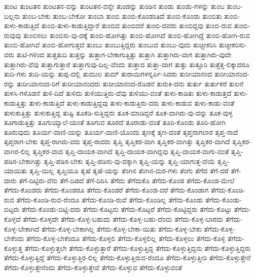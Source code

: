 {ತುಂಟ
ತುಂಟತನ
ತುಂಟತನ-ವನ್ನು
ತುಂಟತನ-ವನ್ನೇ
ತುಂಡನ್ನು
ತುಂಡಿನ
ತುಂಡು
ತುಂಡು-ಗಳನ್ನು
ತುಂಬ
ತುಂಬ-ಬಲ್ಲನು
ತುಂಬ-ಬೇಕು
ತುಂಬ-ಬೇಕೋ
ತುಂಬಾ
ತುಂಬಿ
ತುಂಬಿ-ಕೊಂಡಂತಿದೆ
ತುಂಬಿ-ಕೊಂಡು
ತುಂಬಿತು
ತುಂಬಿ-ತುಳು-ಕಾಡುತ್ತಿದೆ
ತುಂಬಿ-ತುಳು-ಕಾಡುತ್ತಿದ್ದಾರೆ
ತುಂಬಿದ
ತುಂಬಿದರೆ
ತುಂಬಿ-ದವರು
ತುಂಬಿದ್ದವು
ತುಂಬಿ-ರುವ
ತುಂಬಿ-ರುವುವು
ತುಂಬಿಸಲು
ತುಂಬಿಸು-ವು-ದಕ್ಕೆ
ತುಂಬಿ-ಹೋಗಿತ್ತು
ತುಂಬಿ-ಹೋಗಿದೆ
ತುಂಬಿ-ಹೋಗಿದ್ದೆ
ತುಂಬಿ-ಹೋಗಿ-ರುವ
ತುಂಬಿ-ಹೋಗಿವೆ
ತುಂಬಿ-ಹೋಗುತ್ತದೆ
ತುಂಬು
ತುಂಬುತ್ತಿದ್ದರು
ತುಂಬುವ
ತುಂಬು-ವುದು
ತುಚ್ಛೀಕರಿಸಿ
ತುಚ್ಛೀಕರಿಸು-ವರು
ತುಟಿ-ಗಳಿಂದ
ತುತ್ತತುದಿ
ತುತ್ತನ್ನು
ತುತ್ತಾಗ-ಬೇಕಾಗುತ್ತಿತ್ತು
ತುತ್ತಾಗಿ
ತುತ್ತಾಗಿರು-ವಾಗ
ತುತ್ತಾಗಿರು-ವುದೇ
ತುತ್ತಾಗಿರು-ವೆವು
ತುತ್ತಾಗುತ್ತಾರೆ
ತುತ್ತಾಗುವು-ದಿಲ್ಲ-ವೆಂದು
ತುತ್ತಾದ
ತುತ್ತಾ-ದಾಗ
ತುತ್ತು
ತುತ್ತೂರಿ
ತುತ್ತೆತ್ತ-ಲಿಕ್ಕಾದರೂ
ತುದಿ-ಗಳು
ತುದಿ-ಯನ್ನು
ತುಪ್ಪ-ದಲ್ಲಿ
ತುಮುಲ
ತುಮ್
ತುರಾಯಿಗಳನ್ನರ್ಪಿ-ಸಿದರು
ತುರೀಯಾನಂದ
ತುರೀಯಾನಂದ-ರನ್ನು
ತುರೀಯಾನಂದ-ರಿಗೆ
ತುರೀಯಾನಂದರು
ತುರೀಯಾನಂದ-ರೊಡನೆ
ತುರುಕಿ-ದನು
ತುರ್ತು
ತುರ್ತುಕರೆ
ತುಲನೆ
ತುಳಸಿ-ಗಳೊಡನೆ
ತುಳಿ-ದಿದೆ
ತುಳಿದು
ತುಳಿಯುತ್ತಿರು-ವೆವು
ತುಳಿಯು-ವಂತೆ
ತುಳು-ಕಾಡಿತು
ತುಳು-ಕಾಡುತ್ತದೆ
ತುಳು-ಕಾಡುತ್ತಿತ್ತು
ತುಳು-ಕಾಡುತ್ತಿದೆ
ತುಳು-ಕಾಡುತ್ತಿದ್ದವು
ತುಳು-ಕಾಡುತ್ತಿರು-ವರು
ತುಳು-ಕಾಡುವ
ತುಳು-ಕಾಡು-ವಂತೆ
ತುಳುಕುತ್ತಿತ್ತು
ತುಳುಕುತ್ತಿದ್ದ
ತುಷ್ಟಿ
ತೂಕಡಿ-ಸುತ್ತಿದ್ದರು
ತೂಕ-ಮಾಡಿದ್ದರೆ
ತೂಕ-ವಾಗಿರು-ವು-ದನ್ನು
ತೂಕ-ವುಳ್ಳ
ತೂಗಾಡುತ್ತಿತ್ತು
ತೂಗುಯ್ಯಾಲೆ-ಯಂತೆ
ತೂಗುವ
ತೂರದೆ
ತೂರಾಡು-ವಂತೆ
ತೂರಿ-ಕೊಂಡು
ತೂರಿ-ಹೋಗಿ
ತೂರುವುದು
ತೂರ್ಯ-ವಾಣಿ-ಯನ್ನು
ತೂರ್ಯ-ವಾಣಿ-ಯೊಂದು
ತೃಣಕ್ಕೆ
ತೃಣ-ದಂತೆ
ತೃಪ್ತನಾಗಲಾರ
ತೃಪ್ತ-ನಾದೆ
ತೃಪ್ತರಾಗ-ಬೇಕು
ತೃಪ್ತ-ರಾಗಿರು-ವರು
ತೃಪ್ತ-ರಾದರು
ತೃಪ್ತಿ
ತೃಪ್ತಿಕರ-ವಾಗಿ
ತೃಪ್ತಿಕರ-ವಾಗಿತ್ತು
ತೃಪ್ತಿಕರ-ವಾಗಿದೆ
ತೃಪ್ತಿಕರ-ವಾಗಿರ-ಲಿಲ್ಲ
ತೃಪ್ತಿಕರ-ವಾದ
ತೃಪ್ತಿ-ದಾಯಕ-ವಾಗಿದೆ
ತೃಪ್ತಿ-ದಾಯಕ-ವಾಗಿದ್ದವು
ತೃಪ್ತಿ-ದಾಯಕ-ವಾಗು-ವಂತೆ
ತೃಪ್ತಿ-ಪಡಿಸ-ಬೇಕಾಗಿತ್ತು
ತೃಪ್ತಿ-ಪಡಿಸ-ಬೇಕು
ತೃಪ್ತಿ-ಪಡಿಸು-ವು-ದಕ್ಕಾಗಿ
ತೃಪ್ತಿ-ಯನ್ನು
ತೃಪ್ತಿ-ಯಾಗುತ್ತ-ದೆಯೆ
ತೃಪ್ತಿ-ಯಾಯಿತು
ತೃಪ್ತಿ-ಯಿಲ್ಲ
ತೃಪ್ತಿಯೂ
ತೃಷೆ
ತೃಷೆ-ಯನ್ನು
ತೆಂಗಿನ
ತೆಂಗಿನ-ಮರ-ಗಳು
ತೆಂಗು
ತೆಗೆದ
ತೆಗೆ-ದರೆ
ತೆಗೆ-ದಾರು
ತೆಗೆ-ದಿಟ್ಟಿರು-ವೆನು
ತೆಗೆ-ದಿಡದೆ
ತೆಗೆ-ದಿರಿಸಿ
ತೆಗೆದು
ತೆಗೆದುಕೊ
ತೆಗೆದು-ಕೊಂಡ
ತೆಗೆದು-ಕೊಂಡ-ಮೇಲೆ
ತೆಗೆದು-ಕೊಂಡರು
ತೆಗೆದು-ಕೊಂಡರೂ
ತೆಗೆದು-ಕೊಂಡರೆ
ತೆಗೆದು-ಕೊಂಡ-ವರೆ
ತೆಗೆದು-ಕೊಂಡಾಗ
ತೆಗೆದು-ಕೊಂಡಿ-ರುವ
ತೆಗೆದು-ಕೊಂಡಿ-ರುವ-ರೆಂದೂ
ತೆಗೆದು-ಕೊಂಡಿ-ರುವೆ
ತೆಗೆದು-ಕೊಂಡಿಲ್ಲ
ತೆಗೆದು-ಕೊಂಡು
ತೆಗೆದು-ಕೊಂಡು-ಬಿಟ್ಟರು
ತೆಗೆದು-ಕೊಂಡು-ಬಿಟ್ಟಿ-ದರು
ತೆಗೆದು-ಕೊಟ್ಟನು
ತೆಗೆದು-ಕೊಟ್ಟರೆ
ತೆಗೆದು-ಕೊಟ್ಟಿದ್ದರು
ತೆಗೆದು-ಕೊಟ್ಟು
ತೆಗೆದು-ಕೊಳ್ಳದೆ
ತೆಗೆದು-ಕೊಳ್ಳದೇ
ತೆಗೆದು-ಕೊಳ್ಳ-ಬಹುದು
ತೆಗೆದು-ಕೊಳ್ಳ-ಬಹು-ದೆಂದು
ತೆಗೆದು-ಕೊಳ್ಳ-ಬಾರದು
ತೆಗೆದು-ಕೊಳ್ಳ-ಬೇಕಾಗಿದೆ
ತೆಗೆದು-ಕೊಳ್ಳ-ಬೇಕಾಗಿಲ್ಲ
ತೆಗೆದು-ಕೊಳ್ಳ-ಬೇಕಾ-ಯಿತು
ತೆಗೆದು-ಕೊಳ್ಳ-ಬೇಕು
ತೆಗೆದು-ಕೊಳ್ಳ-ಬೇಕೆಂದು
ತೆಗೆದು-ಕೊಳ್ಳ-ಬೇಕೆಂದೂ
ತೆಗೆದು-ಕೊಳ್ಳಲಿ
ತೆಗೆದು-ಕೊಳ್ಳಲಿಲ್ಲ
ತೆಗೆದು-ಕೊಳ್ಳಲು
ತೆಗೆದು-ಕೊಳ್ಳಿ
ತೆಗೆದು-ಕೊಳ್ಳುತ್ತ
ತೆಗೆದು-ಕೊಳ್ಳುತ್ತಲೇ
ತೆಗೆದು-ಕೊಳ್ಳುತ್ತಾರೆ
ತೆಗೆದು-ಕೊಳ್ಳುತ್ತಿದ್ದ
ತೆಗೆದು-ಕೊಳ್ಳುತ್ತಿದ್ದನು
ತೆಗೆದು-ಕೊಳ್ಳುತ್ತಿದ್ದರು
ತೆಗೆದು-ಕೊಳ್ಳುತ್ತಿದ್ದೆ
ತೆಗೆದು-ಕೊಳ್ಳುತ್ತಿರ-ಲಿಲ್ಲ
ತೆಗೆದು-ಕೊಳ್ಳುತ್ತಿರುವ-ರೆಂದೂ
ತೆಗೆದು-ಕೊಳ್ಳುತ್ತೀರಿ
ತೆಗೆದು-ಕೊಳ್ಳುತ್ತೇನೆ
ತೆಗೆದು-ಕೊಳ್ಳುತ್ತೇನೆಂದು
ತೆಗೆದು-ಕೊಳ್ಳುತ್ತೇವೆ
ತೆಗೆದು-ಕೊಳ್ಳುವ
ತೆಗೆದು-ಕೊಳ್ಳುವಂತೆ
}
